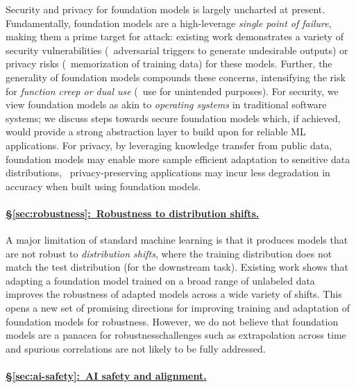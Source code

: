 Security and privacy for foundation models is largely uncharted at present.
Fundamentally, foundation models are a high-leverage \textit{single point of failure}, making them a prime target for attack: existing work demonstrates a variety of security vulnerabilities (\eg~adversarial triggers to generate undesirable outputs) or privacy risks (\eg~memorization of training data) for these models.
Further, the generality of foundation models compounds these concerns, intensifying the risk for \textit{function creep or dual use} (\ie~use for unintended purposes).
For security, we view foundation models as akin to \emph{operating systems} in traditional software systems; we discuss steps towards secure foundation models which, if achieved, would provide a strong abstraction layer to build upon for reliable ML applications. 
For privacy, by leveraging knowledge transfer from public data, foundation models may enable more sample efficient adaptation to sensitive data distributions, \ie~privacy-preserving applications may incur less degradation in accuracy when built using foundation models.

\paragraph{\hyperref[sec:robustness]{§\ref{sec:robustness}:~Robustness to distribution shifts.}}

A major limitation of standard machine learning is that it produces models that are not robust to \emph{distribution shifts}, where the training distribution does not match the test distribution (for the downstream task). 
Existing work shows that adapting a foundation model trained on a broad range of unlabeled data improves the robustness of adapted models across a wide variety of shifts. 
This opens a new set of promising directions for improving training and adaptation of foundation models for robustness. 
However, we do not believe that foundation models are a panacea for robustness\dash{}challenges such as extrapolation across time and spurious correlations are not likely to be fully addressed. 

\paragraph{\hyperref[sec:ai-safety]{§\ref{sec:ai-safety}:~AI safety and alignment.}}

